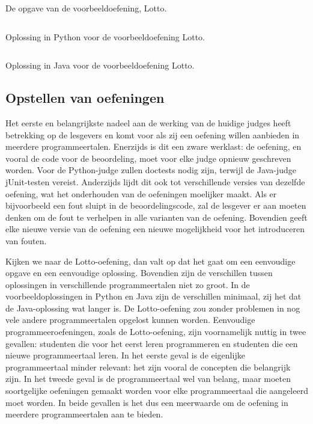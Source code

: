 \begin{listing}
    \begin{quote}
    \end{quote}
    \caption{De opgave van de voorbeeldoefening, Lotto.}
    \label{lst:lotto}
\end{listing}

\begin{listing}
    \inputminted{python3}{../../exercise/lotto/solution/correct.py}
    \caption{Oplossing in Python voor de voorbeeldoefening Lotto.}
    \label{lst:python-solution}
\end{listing}

\begin{listing}
    \inputminted{java}{../../exercise/lotto/solution/correct.java}
    \caption{Oplossing in Java voor de voorbeeldoefening Lotto.}
    \label{lst:java-solution}
\end{listing}

\subsection{Opstellen van oefeningen}\label{subsec:opstellen-van-oefeningen}

Het eerste en belangrijkste nadeel aan de werking van de huidige judges heeft betrekking op de lesgevers en komt voor als zij een oefening willen aanbieden in meerdere programmeertalen.
Enerzijds is dit een zware werklast: de oefening, en vooral de code voor de beoordeling, moet voor elke judge opnieuw geschreven worden.
Voor de Python-judge zullen doctests nodig zijn, terwijl de Java-judge jUnit-testen vereist.
Anderzijds lijdt dit ook tot verschillende versies van dezelfde oefening, wat het onderhouden van de oefeningen moelijker maakt.
Als er bijvoorbeeld een fout sluipt in de beoordelingscode, zal de lesgever er aan moeten denken om de fout te verhelpen in alle varianten van de oefening.
Bovendien geeft elke nieuwe versie van de oefening een nieuwe mogelijkheid voor het introduceren van fouten.

Kijken we naar de Lotto-oefening, dan valt op dat het gaat om een eenvoudige opgave en een eenvoudige oplossing.
Bovendien zijn de verschillen tussen oplossingen in verschillende programmeertalen niet zo groot.
In de voorbeeldoplossingen in Python en Java zijn de verschillen minimaal, zij het dat de Java-oplossing wat langer is.
De Lotto-oefening zou zonder problemen in nog vele andere programmeertalen opgelost kunnen worden.
Eenvoudige programmeeroefeningen, zoals de Lotto-oefening, zijn voornamelijk nuttig in twee gevallen: studenten die voor het eerst leren programmeren en studenten die een nieuwe programmeertaal leren.
In het eerste geval is de eigenlijke programmeertaal minder relevant: het zijn vooral de concepten die belangrijk zijn.
In het tweede geval is de programmeertaal wel van belang, maar moeten soortgelijke oefeningen gemaakt worden voor elke programmeertaal die aangeleerd moet worden.
In beide gevallen is het dus een meerwaarde om de oefening in meerdere programmeertalen aan te bieden.

